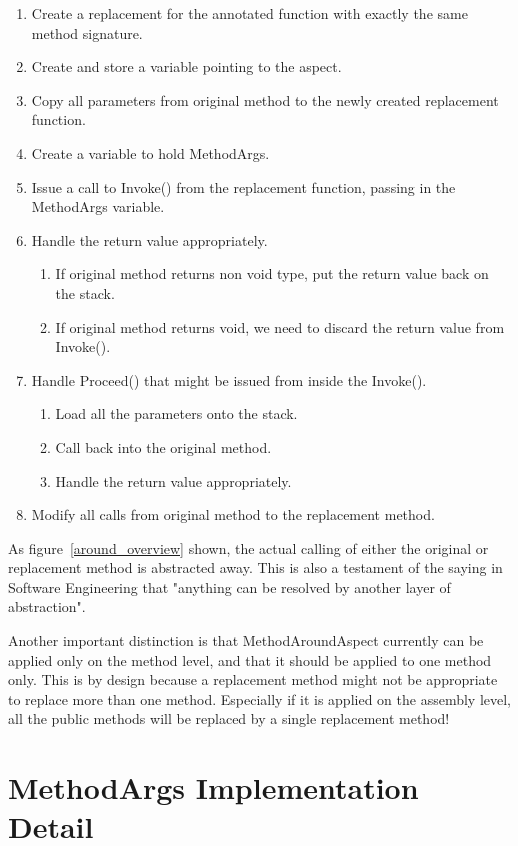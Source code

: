 \begin{enumerate}
	\item Create a replacement for the annotated function with exactly the same method signature.
	\item Create and store a variable pointing to the aspect.
	\item Copy all parameters from original method to the newly created replacement function.
	\item Create a variable to hold MethodArgs.
	\item Issue a call to Invoke() from the replacement function, passing in the MethodArgs variable.
	\item Handle the return value appropriately.
	\begin{enumerate}
		\item If original method returns non void type, put the return value back on the stack.
		\item If original method returns void, we need to discard the return value from Invoke().
	\end{enumerate}
	\item Handle Proceed() that might be issued from inside the Invoke().
	\begin{enumerate}
		\item Load all the parameters onto the stack.
		\item Call back into the original method.
		\item Handle the return value appropriately.
	\end{enumerate}
	\item Modify all calls from original method to the replacement method.
\end{enumerate}

As figure~\ref{around_overview} shown, the actual calling of either the original or replacement method is abstracted away. This is also a testament of the saying in Software Engineering that "anything can be resolved by another layer of abstraction".

Another important distinction is that MethodAroundAspect currently can be applied only on the method level, and that it should be applied to one method only. This is by design because a replacement method might not be appropriate to replace more than one method. Especially if it is applied on the assembly level, all the public methods will be replaced by a single replacement method!

\section{MethodArgs Implementation Detail}

